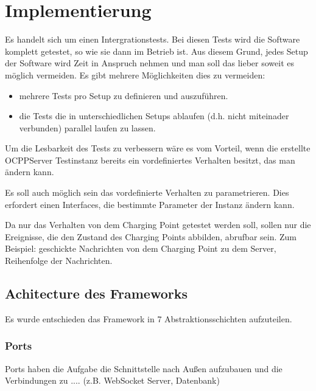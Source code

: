\section{Implementierung}
    Es handelt sich um einen Intergrationstests. Bei diesen Tests wird die Software komplett getestet, so wie sie dann im Betrieb ist.
    Aus diesem Grund, jedes Setup der Software wird Zeit in Anspruch nehmen und man soll das lieber soweit es möglich vermeiden. 
    Es gibt mehrere Möglichkeiten dies zu vermeiden:
    \begin{itemize}
        \item mehrere Tests pro Setup zu definieren und auszuführen.
        \item  die Tests die in unterschiedlichen Setups ablaufen (d.h. nicht miteinader verbunden) parallel laufen zu lassen.
    \end{itemize}


    Um die Lesbarkeit des Tests zu verbessern wäre es vom Vorteil, wenn die erstellte OCPPServer Testinstanz bereits ein vordefiniertes Verhalten besitzt, 
    das man ändern kann.

    Es soll auch möglich sein das vordefinierte Verhalten zu parametrieren. Dies erfordert einen Interfaces, die bestimmte Parameter der Instanz ändern kann.

    Da nur das Verhalten von dem Charging Point getestet werden soll, sollen nur die Ereignisse, die den Zustand des Charging Points abbilden, abrufbar sein.
    Zum Beispiel: geschickte Nachrichten von dem Charging Point zu dem Server, Reihenfolge der Nachrichten.

    \subsection{Achitecture des Frameworks}
    Es wurde entschieden das Framework in 7 Abstraktionsschichten aufzuteilen.
        \subsubsection{Ports}
        Ports haben die Aufgabe die Schnittstelle nach Außen aufzubauen und die Verbindungen zu .... (z.B. WebSocket Server, Datenbank)


